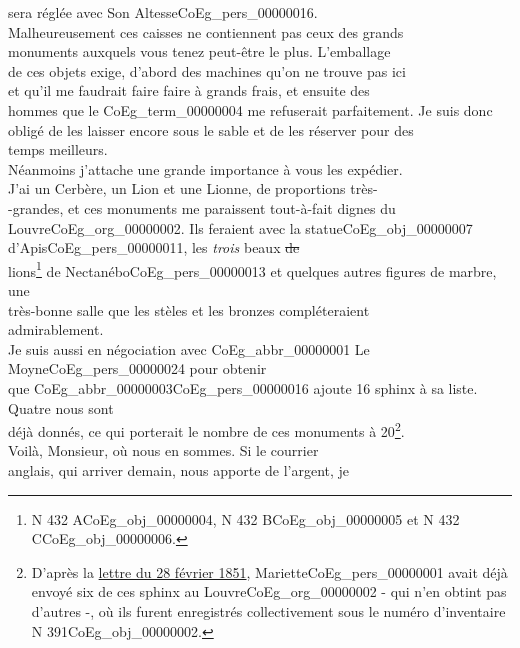 \documentclass{book}
\begin{document}
sera réglée avec Son Altesse\gls{CoEg_pers_00000016}.\\
\indent Malheureusement ces caisses ne contiennent pas ceux des grands\\
monuments auxquels vous tenez peut-être le plus. L’emballage\\
de ces objets exige, d’abord des machines qu’on ne trouve pas ici\\
et qu’il me faudrait faire faire à grands frais, et ensuite des\\
hommes que le \Gls{CoEg_term_00000004} me refuserait parfaitement. Je suis donc\\
obligé de les laisser encore sous le sable et de les réserver pour des\\
temps meilleurs.\\
\indent Néanmoins j’attache une grande importance à vous les expédier.\\
J’ai un Cerbère, un Lion et une Lionne, de proportions très-\\
-grandes, et ces monuments me paraissent tout-à-fait dignes du\\
Louvre\gls{CoEg_org_00000002}. Ils feraient avec la statue\gls{CoEg_obj_00000007} d’Apis\gls{CoEg_pers_00000011}, les \textit{trois} beaux \sout{de}\\
lions\footnote{N 432 A\gls{CoEg_obj_00000004}, N 432 B\gls{CoEg_obj_00000005} et N 432 C\gls{CoEg_obj_00000006}.} de Nectanébo\gls{CoEg_pers_00000013} et quelques autres figures de marbre, une\\
très-bonne salle que les stèles et les bronzes compléteraient\\
admirablement.\\
\indent Je suis aussi en négociation avec \gls{CoEg_abbr_00000001} Le Moyne\gls{CoEg_pers_00000024} pour obtenir\\
que \gls{CoEg_abbr_00000003}\gls{CoEg_pers_00000016} ajoute 16 sphinx à sa liste. Quatre nous sont\\
déjà donnés, ce qui porterait le nombre de ces monuments à 20\footnote{D'après la  \hyperref[CoEg_Mariette_1851-02-28]{lettre du 28 février 1851}, Mariette\gls{CoEg_pers_00000001} avait déjà envoyé six de ces sphinx au Louvre\gls{CoEg_org_00000002} - qui n'en obtint pas d'autres -, où ils furent enregistrés collectivement sous le numéro d'inventaire N 391\gls{CoEg_obj_00000002}.}.\\
\indent Voilà, Monsieur, où nous en sommes. Si le courrier\\
anglais, qui arriver demain, nous apporte de l’argent, je\\
\end{document}
